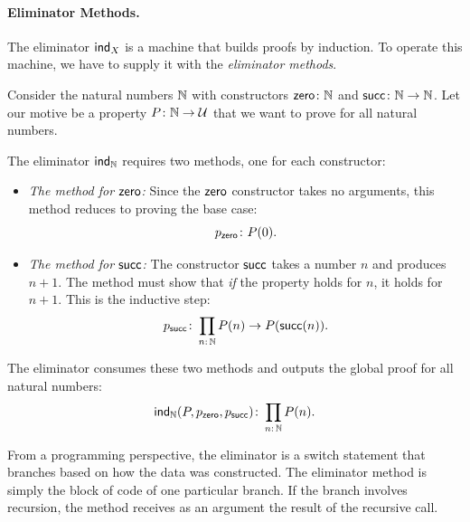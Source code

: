 \paragraph{Eliminator Methods.}
The eliminator $\mathsf{ind}_X$ is a machine that builds proofs by induction. To operate this machine, we have to supply it with the \textsl{eliminator methods}.

Consider the natural numbers $\mathbb{N}$ with constructors $\fun{zero}\colon\N$ and $\fun{succ}\colon\N\to\N$. Let our motive be a property $P\colon\N\to\univ$ that we want to prove for all natural numbers.

The eliminator $\mathsf{ind}_{\mathbb{N}}$ requires two methods, one for each constructor:
\begin{itemize}
    \item \textit{The method for $\mathsf{zero}$:} 
    Since the $\mathsf{zero}$ constructor takes no arguments, this method reduces to proving the base case:
    \[
        p_{\fun{zero}}\colon P(0).
    \]
    
    \item \textit{The method for $\mathsf{succ}$:} 
    The constructor $\mathsf{succ}$ takes a number $n$ and produces $n+1$. The method must show that \textsl{if} the property holds for $n$, it holds for $n+1$. This is the inductive step:
    \[
        p_{\fun{succ}}\colon\prod_{n\colon\N}
            P(n)\to P(\fun{succ}(n)).
    \]
\end{itemize}
The eliminator consumes these two methods and outputs the global proof for all natural numbers:
\[
    \fun{ind}_\N(P,p_{\fun{zero}},p_{\fun{succ}})
        \colon\prod_{n\colon\N}P(n).
\]

\begin{rem}
    From a programming perspective, the eliminator is a switch statement that branches based on how the data was constructed. The eliminator method is simply the block of code of one particular branch. If the branch involves recursion, the method receives as an argument the result of the recursive call.
\end{rem}

